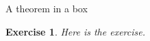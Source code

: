 \documentclass{beamer}
\newtheorem{exe}{Exercise}
\begin{document}
    \begin{frame}{A theorem in a box}
            \begin{exe} Here is the exercise.
            \end{exe}
    \end{frame} 
\end{document}
